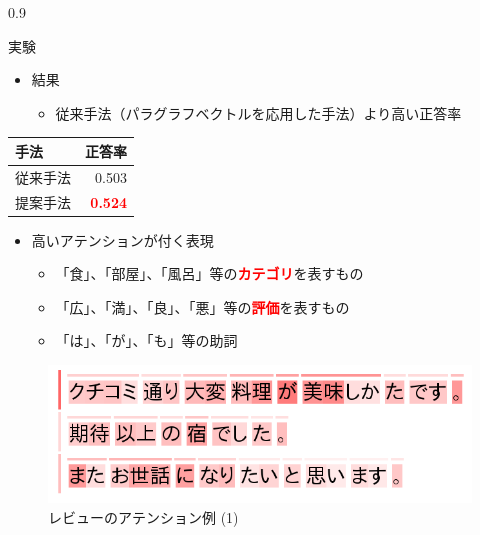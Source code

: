 \documentclass[unicode,10pt]{beamer}
\newlength{\mycolumnwidth}
\newcommand{\itemtitle}[1]{#1\\}
\newcommand{\fire}[1]{\textcolor{red}{\textbf{#1}}}
\begin{document}
\begin{frame}[t]
\begin{columns}[onlytextwidth,t]
\begin{column}{0.9\mycolumnwidth}
\begin{block}{実験}
      \begin{minipage}[t]{0.55\linewidth}
        \begin{itemize}
          \item \itemtitle{結果}
            \begin{itemize}
              \item 従来手法（パラグラフベクトルを応用した手法）より高い正答率
            \end{itemize}
        \end{itemize}
      \end{minipage}%
      \begin{minipage}[t]{0.4\linewidth}
        \begin{table}
          \centering
          \begin{tabular}{l | r}
            手法 & 正答率 \\
            \hline
            従来手法\cite{me16} & 0.503        \\
            提案手法            & \fire{0.524} \\
          \end{tabular}
        \end{table}
      \end{minipage}

      \begin{itemize}
        \item 高いアテンションが付く表現
          \begin{itemize}
            \item 「食」、「部屋」、「風呂」等の\fire{カテゴリ}を表すもの
            \item 「広」、「満」、「良」、「悪」等の\fire{評価}を表すもの
            \item 「は」、「が」、「も」等の助詞
          \end{itemize}
      \end{itemize}

      \begin{figure}
        \centering
        \includegraphics[width=0.9\linewidth]{fig/review_1.png}
        \caption*{レビューのアテンション例 (1)}
      \end{figure}


\end{block}
\end{column}
\end{columns}
\end{frame}
\end{document}
